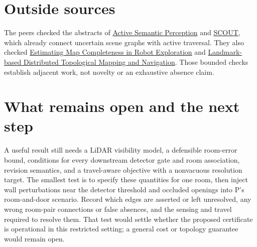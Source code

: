 \documentclass{article}
\begin{document}
\section*{Outside sources}

The peers checked the abstracts of \href{https://arxiv.org/abs/2510.05430}{Active Semantic Perception} and \href{https://arxiv.org/abs/2606.06721}{SCOUT}, which already connect uncertain scene graphs with active traversal. They also checked \href{https://arxiv.org/abs/2406.13482}{Estimating Map Completeness in Robot Exploration} and \href{https://arxiv.org/abs/2103.03741}{Landmark-based Distributed Topological Mapping and Navigation}. Those bounded checks establish adjacent work, not novelty or an exhaustive absence claim. 

\section*{What remains open and the next step}

A useful result still needs a LiDAR visibility model, a defensible room-error bound, conditions for every downstream detector gate and room association, revision semantics, and a travel-aware objective with a nonvacuous resolution target. The smallest test is to specify these quantities for one room, then inject wall perturbations near the detector threshold and occluded openings into P's room-and-door scenario. Record which edges are asserted or left unresolved, any wrong room-pair connections or false absences, and the sensing and travel required to resolve them. That test would settle whether the proposed certificate is operational in this restricted setting; a general cost or topology guarantee would remain open. 
\end{document}
